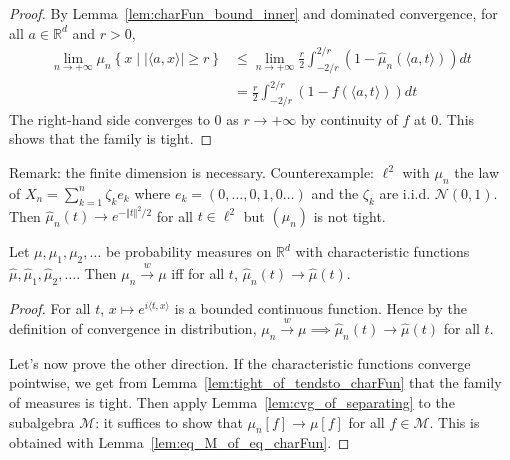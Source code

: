 \begin{proof}
\leanok
By Lemma~\ref{lem:charFun_bound_inner} and dominated convergence, for all $a \in \mathbb{R}^d$ and $r > 0$,
\begin{align*}
    \lim_{n \to +\infty} \mu_n \left\{x \mid |\langle a, x\rangle| \ge r\right\}
    &\le \lim_{n \to +\infty} \frac{r}{2} \int_{-2/r}^{2/r} (1 - \hat{\mu}_n(\langle a, t\rangle))dt
    \\
    &= \frac{r}{2} \int_{-2/r}^{2/r} (1 - f(\langle a, t\rangle))dt
\end{align*}
The right-hand side converges to 0 as $r \to +\infty$ by continuity of $f$ at 0.
This shows that the family is tight.
\end{proof}

Remark: the finite dimension is necessary.
Counterexample: $\ell^2$ with $\mu_n$ the law of $X_n = \sum_{k=1}^n \zeta_k e_k$ where $e_k = (0, \ldots, 0, 1, 0 \ldots)$ and the $\zeta_k$ are i.i.d. $\mathcal N(0,1)$.
Then $\hat{\mu}_n(t) \to e^{- \Vert t \Vert^2 / 2}$ for all $t \in \ell^2$ but $(\mu_n)$ is not tight.


\begin{theorem}
\label{thm:charFun_tendsto_iff_measure_tendsto}
\leanok
{}
Let $\mu, \mu_1, \mu_2, \ldots$ be probability measures on $\mathbb{R}^d$ with characteristic functions $\hat{\mu}, \hat{\mu}_1, \hat{\mu}_2, \ldots$. Then $\mu_n \xrightarrow{w} \mu$ iff for all $t$, $\hat{\mu}_n(t) \to \hat{\mu}(t)$.
\end{theorem}

\begin{proof}
For all $t$, $x \mapsto e^{i \langle t, x \rangle}$ is a bounded continuous function. Hence by the definition of convergence in distribution, $\mu_n \xrightarrow{w} \mu \implies \hat{\mu}_n(t) \to \hat{\mu}(t)$ for all $t$.

Let's now prove the other direction.
If the characteristic functions converge pointwise, we get from Lemma~\ref{lem:tight_of_tendsto_charFun} that the family of measures is tight.
Then apply Lemma~\ref{lem:cvg_of_separating} to the subalgebra $\mathcal M$: it suffices to show that $\mu_n[f] \to \mu[f]$ for all $f \in \mathcal M$. This is obtained with Lemma~\ref{lem:eq_M_of_eq_charFun}.
\end{proof}